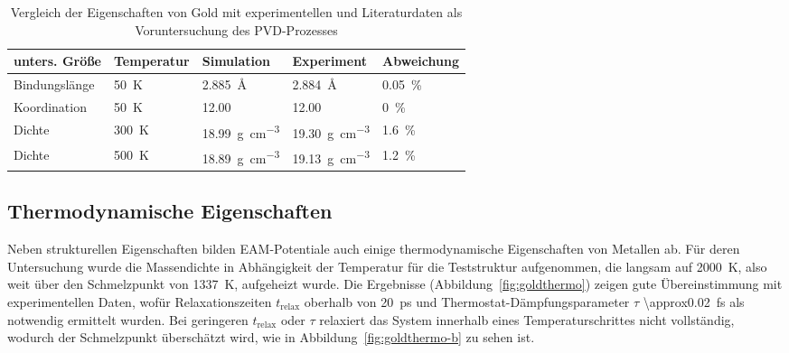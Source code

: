 \begin{table}
  \caption[Eigenschaften von Gold]{Vergleich der Eigenschaften von Gold mit experimentellen und Literaturdaten als Voruntersuchung des PVD-Prozesses
  }
  \label{tab:goldpreresults}
  \begin{tabularx}{\textwidth}{|lXXXX|}
    \hline
    \textbf{unters. Größe} & \textbf{Temperatur} & \textbf{Simulation} & \textbf{Experiment} & \textbf{Abweichung}\\
    \hline
    Bindungslänge  &  \SI{50}{\kelvin}   &  \SI{2.885}{\angstrom}                    &  \SI{2.884}{\angstrom}                    &  \SI{0.05}{\percent}  \\
    Koordination   &  \SI{50}{\kelvin}   &  \SI{12.00}{}                             &  \SI{12.00}{}                             &  \SI{0}{\percent}     \\
    Dichte         &  \SI{300}{\kelvin}  &  \SI{18.99}{\gram\per\cubic\centi\meter}  &  \SI{19.30}{\gram\per\cubic\centi\meter}  &  \SI{1.6}{\percent}   \\
    Dichte         &  \SI{500}{\kelvin}  &  \SI{18.89}{\gram\per\cubic\centi\meter}  &  \SI{19.13}{\gram\per\cubic\centi\meter}  &  \SI{1.2}{\percent}   \\
    \hline
  \end{tabularx}
\end{table}


\subsection{Thermodynamische Eigenschaften}
\label{goldthermo}

Neben strukturellen Eigenschaften bilden EAM-Potentiale auch einige thermodynamische Eigenschaften von Metallen ab.
Für deren Untersuchung wurde die Massendichte in Abhängigkeit der Temperatur für die Teststruktur aufgenommen, die langsam auf \SI{2000}{\kelvin}, also weit über den Schmelzpunkt von \SI{1337}{\kelvin}, aufgeheizt wurde.
Die Ergebnisse (Abbildung~\ref{fig:goldthermo}) zeigen gute Übereinstimmung mit experimentellen Daten, wofür Relaxationszeiten $t_\text{relax}$ oberhalb von \SI{20}{\pico\second} und Thermostat-Dämpfungsparameter $\tau$ \SI{\approx0.02}{\femto\second} als notwendig ermittelt wurden.
Bei geringeren $t_\text{relax}$ oder $\tau$ relaxiert das System innerhalb eines Temperaturschrittes nicht vollständig, wodurch der Schmelzpunkt überschätzt wird, wie in Abbildung~\ref{fig:goldthermo-b} zu sehen ist.

